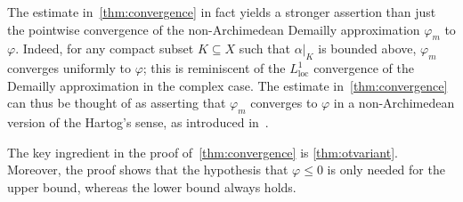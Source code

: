 \documentclass[10pt,reqno]{amsart}
\theoremstyle{plain}
\theoremstyle{definition}
\numberwithin{equation}{section}
\begin{document}
The estimate in~\cref{thm:convergence} in fact yields a stronger assertion than just the pointwise convergence of the non-Archimedean Demailly approximation $\varphi_m$ to $\varphi$. Indeed, for any compact subset $K \subseteq X$ such that $\alpha |_K$ is bounded above, $\varphi_m$ converges uniformly to $\varphi$; this is reminiscent of the $L^1_{\textrm{loc}}$ convergence of the Demailly approximation in the complex case.
The estimate in~\cref{thm:convergence} can thus be thought of as asserting that $\varphi_m$ converges to $\varphi$ in a non-Archimedean version of the Hartog's sense, as introduced in~\cite[Definition 3.2.3]{dinh-sibony}.

The key ingredient in the proof of~\cref{thm:convergence} is \cref{thm:otvariant}. Moreover, the proof shows that the hypothesis that $\varphi \leq 0$ is only needed for the upper bound, whereas the lower bound always holds.
\end{document}
